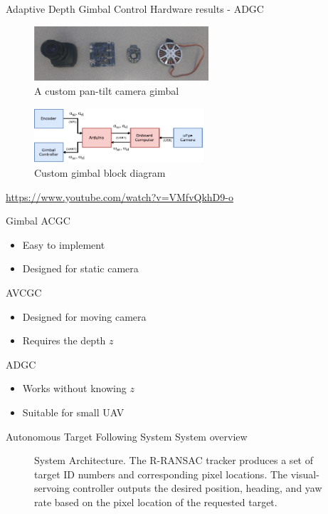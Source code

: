 \documentclass[9pt]{beamer}
\begin{document}
\begin{frame}{Adaptive Depth Gimbal Control}
Hardware results - ADGC
\begin{figure}[htbp]
	\centering
	\includegraphics[height=0.8in]{chapter2/gimbal_parts.png}
	\caption{A custom pan-tilt camera gimbal}
	\label{gimbal_parts}
\end{figure}
\begin{figure}[htbp]
	\centering
	\includegraphics[height=0.8in]{chapter2/gimbal_system_blockdiagram}
	\caption{Custom gimbal block diagram}
	\label{gimbal_blockdiagram}
\end{figure}	
\href{https://www.youtube.com/watch?v=VMfvQkhD9-o}{https://www.youtube.com/watch?v=VMfvQkhD9-o}
\end{frame}

\begin{frame}{Gimbal}
ACGC
\begin{itemize}
	\item Easy to implement
	\item Designed for static camera
\end{itemize}
AVCGC
\begin{itemize}
	\item Designed for moving camera
	\item Requires the depth $z$
\end{itemize}
ADGC
\begin{itemize}
	\item Works without knowing $z$
	\item Suitable for small UAV
\end{itemize}
\end{frame}

\begin{frame}{Autonomous Target Following System}
System overview
\begin{figure}[htbp]
	\centering
	\caption{System Architecture. The R-RANSAC tracker produces a set of target ID numbers and corresponding pixel locations. The visual-servoing controller outputs the desired position, heading, and yaw rate based on the pixel location of the requested target.}
	\label{system}
\end{figure}
\end{frame}
\end{document}
